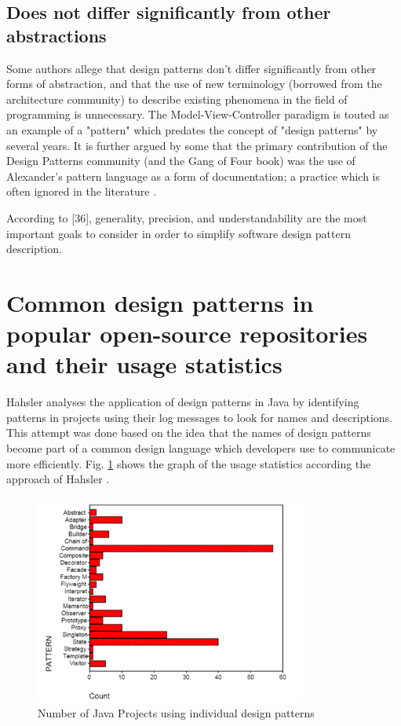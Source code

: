 \documentclass[sigplan,12pt,nonacm=true,review=false]{acmart}
\begin{document}
\subsection{Does not differ significantly from other abstractions}
Some authors allege that design patterns don't differ significantly from other forms of abstraction, and that the use of new terminology (borrowed from the architecture community) to describe existing phenomena in the field of programming is unnecessary. The Model-View-Controller paradigm is touted as an example of a "pattern" which predates the concept of "design patterns" by several years. It is further argued by some that the primary contribution of the Design Patterns community (and the Gang of Four book) was the use of Alexander's pattern language as a form of documentation; a practice which is often ignored in the literature \cite{noauthor_design_nodate}.

According to [36], generality, precision, and understandability are the most important goals to consider in order to simplify software design pattern description.

\section{Common design patterns in popular open-source repositories and their usage statistics}
Hahsler \cite{hahsler_quantitative_2003} analyses the application of design patterns in Java by identifying patterns in projects using their log messages to look for names and descriptions. This attempt was done based on the idea that the names of design patterns become part of a common design language which developers  use  to  communicate more  efficiently. Fig. \ref{fig:stats1} shows the graph of the usage statistics according the approach of Hahsler \cite{hahsler_quantitative_2003}.

\begin{figure}[!t]
  \includegraphics[width=0.8\textwidth]{eolang/tr-02/assets/Picture3.png}
  \caption{Number of Java Projects using individual design patterns \cite{hahsler_quantitative_2003}}
  \label{fig:stats1}
\end{figure}
\end{document}
